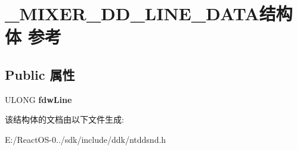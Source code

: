 \hypertarget{struct___m_i_x_e_r___d_d___l_i_n_e___d_a_t_a}{}\section{\+\_\+\+M\+I\+X\+E\+R\+\_\+\+D\+D\+\_\+\+L\+I\+N\+E\+\_\+\+D\+A\+T\+A结构体 参考}
\label{struct___m_i_x_e_r___d_d___l_i_n_e___d_a_t_a}
\subsection*{Public 属性}
\begin{DoxyCompactItemize}
\item 
\mbox{\label{struct___m_i_x_e_r___d_d___l_i_n_e___d_a_t_a_a9f6adf3ef50fca704795cd71f847fac2}} 
U\+L\+O\+NG {\bfseries fdw\+Line}
\end{DoxyCompactItemize}


该结构体的文档由以下文件生成\+:\begin{DoxyCompactItemize}
\item 
E\+:/\+React\+O\+S-\/0../sdk/include/ddk/ntddsnd.\+h\end{DoxyCompactItemize}
